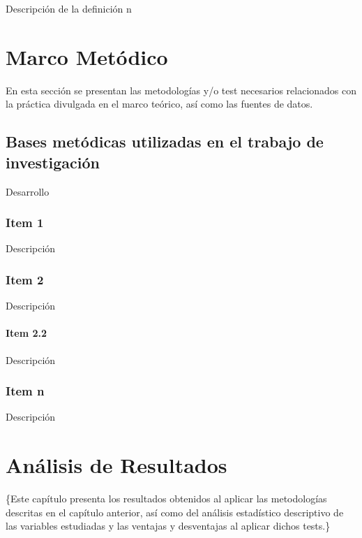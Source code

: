 \documentclass[oneside,11pt]{Latex/Classes/PhDthesisPSnPDF}
\begin{document}
Descripción de la definición n\\

\chapter{Marco Metódico}

En esta sección se presentan las metodologías y/o test necesarios
relacionados con la práctica divulgada en el marco teórico, así como las
fuentes de datos.

\section{Bases metódicas utilizadas en el trabajo de investigación}

Desarrollo\\

\subsection{Item 1}

Descripción\\

\subsection{Item 2}

Descripción\\

\subsubsection{Item 2.2}

Descripción\\

\subsection{Item n}

Descripción\\

\chapter{Análisis de Resultados}

\{\small Este capítulo presenta los resultados obtenidos al aplicar las
metodologías descritas en el capítulo anterior, así como del análisis
estadístico descriptivo de las variables estudiadas y las ventajas y
desventajas al aplicar dichos tests.\}
\end{document}
